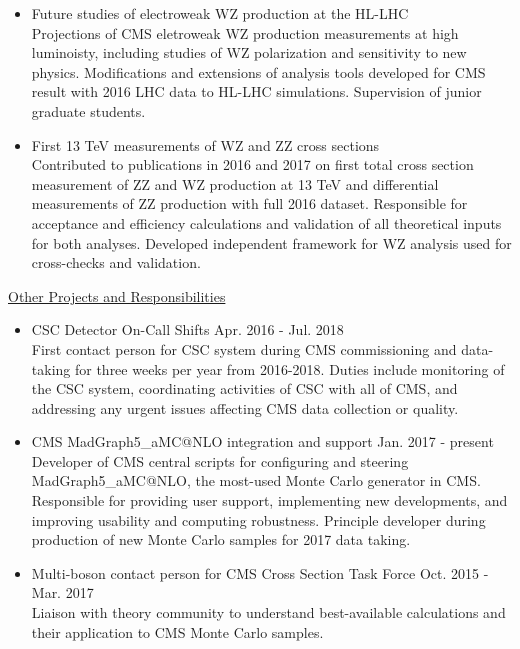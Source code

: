 \documentclass[10pt]{res} %
\begin{document}
\begin{resume}
\begin{itemize}
  \item{Future studies of electroweak WZ production at the HL-LHC} \\
    Projections of CMS eletroweak WZ production measurements at high luminoisty, including studies of
    WZ polarization and sensitivity to new physics. 
    Modifications and extensions of analysis tools developed for CMS result with 2016 LHC data to 
    HL-LHC simulations. Supervision of junior graduate students.

  \item{First 13 TeV measurements of WZ and ZZ cross sections} \\
    Contributed to publications in 2016 and 2017 on first total cross section measurement 
    of ZZ and WZ production at 13 TeV and differential measurements of ZZ production with full 2016 dataset. 
    Responsible for acceptance
    and efficiency calculations and validation of all theoretical inputs for both analyses. 
    Developed independent framework for WZ analysis used for cross-checks and validation.

\end{itemize}

\underline{Other Projects and Responsibilities}
\vspace{2mm}
\begin{itemize}
  \item CSC Detector On-Call Shifts \hfill{Apr. 2016 - Jul. 2018} \\
    First contact person for CSC system during CMS commissioning and data-taking for three weeks per year
    from 2016-2018. Duties include monitoring of the CSC system, coordinating activities of CSC with all of CMS, 
    and addressing any urgent issues affecting CMS data collection or quality.

  \item CMS MadGraph5\_aMC@NLO integration and support \hfill{Jan. 2017 - present} \\
    Developer of CMS central scripts
    for configuring and steering MadGraph5\_aMC@NLO, the most-used Monte Carlo generator in CMS. Responsible for 
    providing user support, implementing new developments, 
    and improving usability and computing robustness. Principle developer during production
    of new Monte Carlo samples for 2017 data taking.

  \item Multi-boson contact person for CMS Cross Section Task Force \hfill{Oct. 2015 - Mar. 2017} \\
    Liaison with theory community to understand best-available calculations and 
    their application to CMS Monte Carlo samples. 


\end{itemize}
\end{resume}
\end{document}
